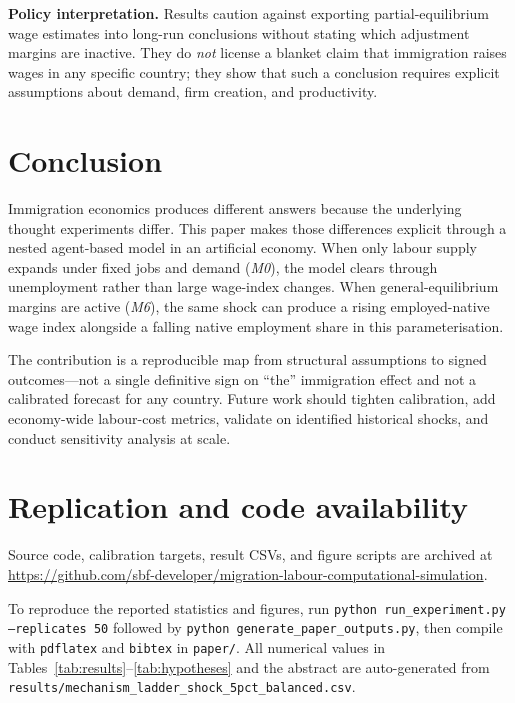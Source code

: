 \documentclass[11pt,a4paper]{article}
\begin{document}
\textbf{Policy interpretation.}
Results caution against exporting partial-equilibrium wage estimates into long-run conclusions without stating which adjustment margins are inactive.
They do \emph{not} license a blanket claim that immigration raises wages in any specific country; they show that such a conclusion requires explicit assumptions about demand, firm creation, and productivity.

\section{Conclusion}
\label{sec:conclusion}

Immigration economics produces different answers because the underlying thought experiments differ.
This paper makes those differences explicit through a nested agent-based model in an artificial economy.
When only labour supply expands under fixed jobs and demand (\emph{M0}), the model clears through unemployment rather than large wage-index changes.
When general-equilibrium margins are active (\emph{M6}), the same shock can produce a rising employed-native wage index alongside a falling native employment share in this parameterisation.

The contribution is a reproducible map from structural assumptions to signed outcomes---not a single definitive sign on ``the'' immigration effect and not a calibrated forecast for any country.
Future work should tighten calibration, add economy-wide labour-cost metrics, validate on identified historical shocks, and conduct sensitivity analysis at scale.

\section*{Replication and code availability}
\noindent
Source code, calibration targets, result CSVs, and figure scripts are archived at\\
\url{https://github.com/sbf-developer/migration-labour-computational-simulation}.

\smallskip\noindent
To reproduce the reported statistics and figures, run \texttt{python run\_experiment.py --replicates 50} followed by \texttt{python generate\_paper\_outputs.py}, then compile with \texttt{pdflatex} and \texttt{bibtex} in \texttt{paper/}.
All numerical values in Tables~\ref{tab:results}--\ref{tab:hypotheses} and the abstract are auto-generated from \texttt{results/mechanism\_ladder\_shock\_5pct\_balanced.csv}.


\end{document}
